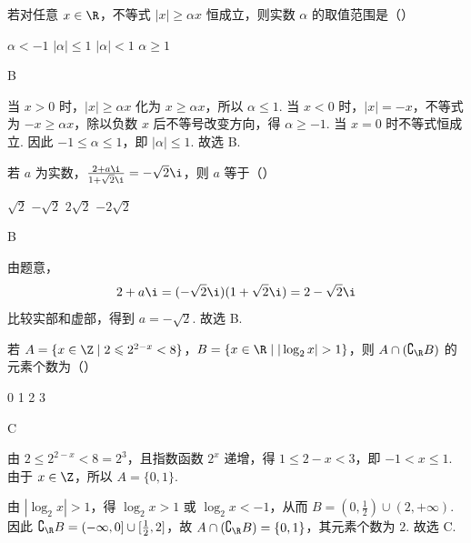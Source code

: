 \begin{problem}
若对任意 \(x \in \R\)，不等式 \(|x| \geqslant \alpha x\) 恒成立，则实数 \(\alpha\) 的取值范围是（\quad）

\choices
    {\(\alpha < -1\)}
    {\(|\alpha| \leqslant 1\)}
    {\(|\alpha| < 1\)}
    {\(\alpha \geqslant 1\)}
\end{problem}

\begin{answer}
B
\end{answer}

\begin{solution}
当 \(x>0\) 时，\(|x|\geqslant\alpha x\) 化为 \(x\geqslant\alpha x\)，所以 \(\alpha\leqslant1\). 当 \(x<0\) 时，\(|x|=-x\)，不等式为 \(-x\geqslant\alpha x\)，除以负数 \(x\) 后不等号改变方向，得 \(\alpha\geqslant-1\). 当 \(x=0\) 时不等式恒成立. 因此 \(-1\leqslant\alpha\leqslant1\)，即 \(|\alpha|\leqslant1\). 故选 B.
\end{solution}

\begin{problem}
若 \(a\) 为实数，\(\frac{2 + a\i}{1 + \sqrt{2}\i} = -\sqrt{2}\i\)，则 \(a\) 等于（\quad）

\choices
    {\(\sqrt{2}\)}
    {\(-\sqrt{2}\)}
    {\(2 \sqrt{2}\)}
    {\(-2\sqrt{2}\)}
\end{problem}

\begin{answer}
B
\end{answer}

\begin{solution}
由题意，
\[
2+a\i=(-\sqrt{2}\i)(1+\sqrt{2}\i)=2-\sqrt{2}\i
\]
比较实部和虚部，得到 \(a=-\sqrt{2}\). 故选 B.
\end{solution}

\begin{problem}
若 \(A = \{x \in \Z \mid 2 \leqslant 2^{2 - x} < 8\}\)，\(B = \{x \in \R \mid |\log_2 x| > 1\}\)，则 \(A \cap (\complement_{\R} B)\) 的元素个数为（\quad）

\choices
    {0}
    {1}
    {2}
    {3}
\end{problem}

\begin{answer}
C
\end{answer}

\begin{solution}
由 \(2\leqslant2^{2-x}<8=2^3\)，且指数函数 \(2^x\) 递增，得 \(1\leqslant2-x<3\)，即 \(-1<x\leqslant1\). 由于 \(x\in\Z\)，所以 \(A=\{0,1\}\).

由 \(|\log_2x|>1\)，得 \(\log_2x>1\) 或 \(\log_2x<-1\)，从而 \(B=(0,\frac12)\cup(2,+\infty)\). 因此 \(\complement_{\R}B=(-\infty,0]\cup[\frac12,2]\)，故 \(A\cap(\complement_{\R}B)=\{0,1\}\)，其元素个数为 \(2\). 故选 C.
\end{solution}

